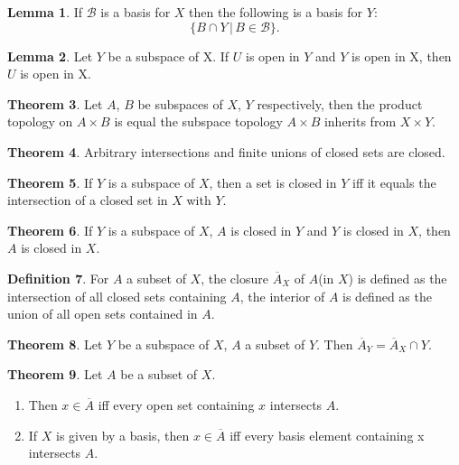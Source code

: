 \documentclass[twocolumn]{article}
\theoremstyle{definition}
\newtheorem{definition}{Definition}[section]
\newtheorem{theorem}[definition]{Theorem}
\newtheorem{lemma}[definition]{Lemma}
\begin{document}
\begin{lemma}
    If $\mathcal{B}$ is a basis for $X$ then the following is a basis for $Y$:
    \begin{equation}
        \{ B \cap Y \, | \, B \in \mathcal{B} \}.
    \end{equation}
\end{lemma}
\begin{lemma}
    Let $Y$ be a subspace of X. If $U$ is open in $Y$ and $Y$ is open in X, then $U$ is open in X.
\end{lemma}
\begin{theorem}
    Let $A$, $B$ be subspaces of $X$, $Y$ respectively, then the product topology on $A \times B$ is
    equal the subspace topology $A \times B$ inherits from $X \times Y$.
\end{theorem}
\begin{theorem}
    Arbitrary intersections and finite unions of closed sets are closed.
\end{theorem}
\begin{theorem}
    If $Y$ is a subspace of $X$, then a set is closed in $Y$ iff it equals the intersection of a closed set in $X$ with $Y$.
\end{theorem}
\begin{theorem}
    If $Y$ is a subspace of $X$, $A$ is closed in $Y$ and $Y$ is closed in $X$, then $A$ is closed in $X$.
\end{theorem}
\begin{definition}
    For $A$ a subset of $X$, the closure $\overline{A}_X$ of $A$(in $X$) is defined as the intersection of all closed sets containing $A$,
    the interior of $A$ is defined as the union of all open sets contained in $A$.
\end{definition}
\begin{theorem}
    Let $Y$ be a subspace of $X$, $A$ a subset of $Y$. Then $\overline{A}_Y = \overline{A}_X \cap Y$.
\end{theorem}

\begin{theorem}
    Let $A$ be a subset of $X$.
    \begin{enumerate}[noitemsep]
        \item Then $x \in \overline{A}$ iff every open set containing $x$ intersects $A$.
        \item If $X$ is given by a basis, then $x \in \overline{A}$ iff every basis element containing x intersects $A$.
    \end{enumerate}
\end{theorem}
\end{document}
